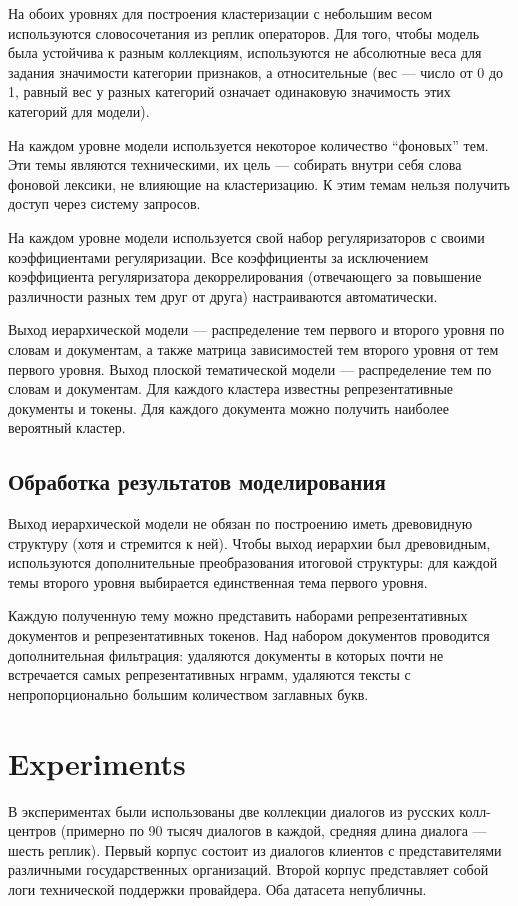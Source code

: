 На обоих уровнях для построения кластеризации с небольшим весом используются словосочетания из реплик операторов. Для того, чтобы модель была устойчива к разным коллекциям, используются не абсолютные веса для задания значимости категории признаков,  а относительные (вес — число от 0 до 1, равный вес у разных категорий означает одинаковую значимость этих категорий для модели).

На каждом уровне модели используется некоторое количество “фоновых” тем. Эти темы являются техническими, их цель — собирать внутри себя слова фоновой лексики, не влияющие на кластеризацию. К этим темам нельзя получить доступ через систему запросов. 

На каждом уровне модели используется свой набор регуляризаторов с своими коэффициентами регуляризации. Все коэффициенты за исключением коэффициента регуляризатора декоррелирования (отвечающего за повышение различности разных тем друг от друга) настраиваются автоматически. 

Выход иерархической модели — распределение тем первого и второго уровня по словам и документам, а также матрица зависимостей тем второго уровня от тем первого уровня. Выход плоской тематической модели — распределение тем по словам и документам. Для каждого кластера известны репрезентативные документы и токены. Для каждого документа можно получить наиболее вероятный кластер.

\subsection{Обработка результатов моделирования}
Выход иерархической модели не обязан по построению иметь древовидную структуру (хотя и стремится к ней). Чтобы выход иерархии был древовидным, используются дополнительные преобразования итоговой структуры: для каждой темы второго уровня выбирается единственная тема первого уровня. 

Каждую полученную тему можно представить наборами репрезентативных документов и репрезентативных токенов. Над набором документов проводится дополнительная фильтрация: удаляются документы в которых почти не встречается самых репрезентативных нграмм, удаляются тексты с непропорционально большим количеством заглавных букв.


\section{Experiments}

В экспериментах были использованы две коллекции диалогов из русских колл-центров (примерно по 90 тысяч диалогов в каждой, средняя длина диалога --- шесть реплик). Первый корпус состоит из диалогов клиентов с представителями различными государственных организаций. Второй корпус представляет собой логи технической поддержки провайдера. Оба датасета непубличны.

